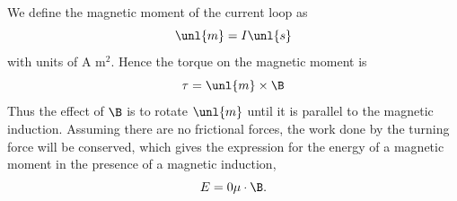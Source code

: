 \documentclass[a4paper, 11pt, normalem]{report}
\begin{document}
We define the magnetic moment of the current loop as
\begin{equation}
    \unl{m} = I\unl{s}
\end{equation}
with units of A m$^2$.
Hence the torque on the magnetic moment is 
\begin{equation}
    \tau = \unl{m} \times \B
\end{equation}
Thus the effect of $\B$ is to rotate $\unl{m}$ until it is parallel to the magnetic induction. 
Assuming there are no frictional forces, the work done by the turning force will be conserved, which gives the expression for the energy of a magnetic moment in the presence of a magnetic induction, 
\begin{equation}
    E = 0\mu\cdot\B.
\end{equation}
\end{document}
